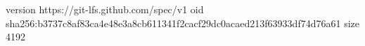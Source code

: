 version https://git-lfs.github.com/spec/v1
oid sha256:b3737c8af83ca4e48e3a8cb611341f2cacf29dc0acaed213f63933df74d76a61
size 4192
